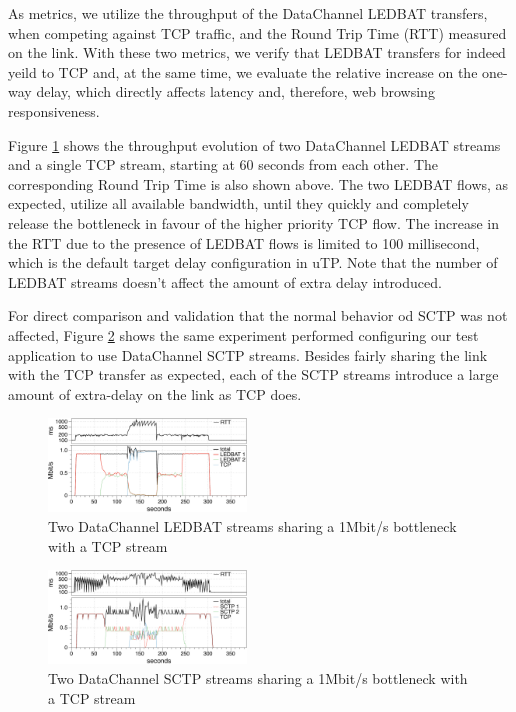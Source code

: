 \documentclass{sig-alternate}
\begin{document}
As metrics, we utilize the throughput of the DataChannel LEDBAT transfers, when competing
against TCP traffic, and the Round Trip Time (RTT) measured on the link. With these two
metrics, we verify that LEDBAT transfers for indeed yeild to TCP and, at the same time, we
evaluate the relative increase on the one-way delay, which directly affects latency and,
therefore, web browsing responsiveness.

Figure \ref{fig:2ledbat_tcp} shows the throughput evolution of two DataChannel LEDBAT
streams and a single TCP stream, starting at 60 seconds from each other. The corresponding
Round Trip Time is also shown above. The two LEDBAT flows, as expected, utilize all
available bandwidth, until they quickly and completely release the bottleneck in favour of
the higher priority TCP flow. The increase in the RTT due to the presence of LEDBAT flows
is limited to 100 millisecond, which is the default target delay configuration in
uTP. Note that the number of LEDBAT streams doesn't affect the amount of extra delay
introduced.


For direct comparison and validation that the normal behavior od SCTP was not affected,
Figure \ref{fig:2sctp_tcp} shows the same experiment performed configuring our test
application to use DataChannel SCTP streams. Besides fairly sharing the link with the TCP
transfer as expected, each of the SCTP streams introduce a large amount of extra-delay on
the link as TCP does.





\begin{figure}[t]
  \centering
    \includegraphics[width=0.47\textwidth]{figs/2ledbat_tcp}
\vspace*{-0.38cm}
	\caption{Two DataChannel LEDBAT streams sharing a 1Mbit/s bottleneck with a TCP stream} \label{fig:2ledbat_tcp}
\vspace*{-0.4cm}
\end{figure}

\begin{figure}[t]
  \centering
    \includegraphics[width=0.47\textwidth]{figs/2sctp_tcp}
\vspace*{-0.38cm}
	\caption{Two DataChannel SCTP  streams sharing a 1Mbit/s bottleneck with a TCP stream} \label{fig:2sctp_tcp}
\vspace*{-0.4cm}
\end{figure}



\end{document}
